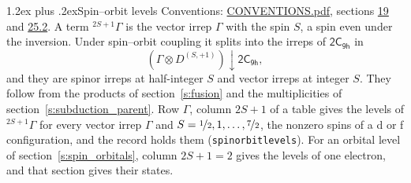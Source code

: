\documentclass[10pt,a4paper]{article}
\makeatletter
\renewcommand\section{\@startsection{section}{1}{\z@}{-3ex plus -1ex minus -.2ex}%
  {1.2ex plus .2ex}{\normalfont\large\sffamily\bfseries\color{parttitle}}}
\numberwithin{equation}{section}
\newcommand{\grp}[1]{\mathsf{#1}}
\newcommand{\restr}[2]{#1\!\downarrow#2}
\newcommand{\irrJp}[2]{D^{(#1,#2)}}
\newcommand{\irrprod}{\otimes}
\newcommand{\term}[2]{{}^{#1}#2}
\makeatother
\begin{document}
\section{Spin--orbit levels}\label{s:spin_orbit}
Conventions: \href{../../CONVENTIONS.pdf}{CONVENTIONS.pdf}, sections \href{../../../rotation/CONVENTIONS.pdf\#conv.19}{19} and \href{../../CONVENTIONS.pdf\#conv.25.2}{25.2}.
\leavevmode\label{n:local.spin}\label{n:symbol.term}A term $\term{2S+1}{\Gamma}$ is the vector irrep $\Gamma$ with the spin $S$, a spin even under the inversion. Under spin--orbit coupling it splits into the irreps of $\grp{2C_{9h}}$ in
\begin{equation}\label{e:spinorbit}\restr{(\Gamma \irrprod \irrJp{S}{+1})}{\grp{2C_{9h}}},\end{equation}
and they are spinor irreps at half-integer $S$ and vector irreps at integer $S$. They follow from the products of section~\ref{s:fusion} and the multiplicities of section~\ref{s:subduction_parent}. Row $\Gamma$, column $2S + 1$ of a table gives the levels of $\term{2S+1}{\Gamma}$ for every vector irrep $\Gamma$ and $S = \nicefrac{1}{2}, 1, \dots, \nicefrac{7}{2}$, the nonzero spins of a d or f configuration, and the record holds them (\texttt{spinorbitlevels}). For an orbital level of section~\ref{s:spin_orbitals}, column $2S + 1 = 2$ gives the levels of one electron, and that section gives their states.
\end{document}
